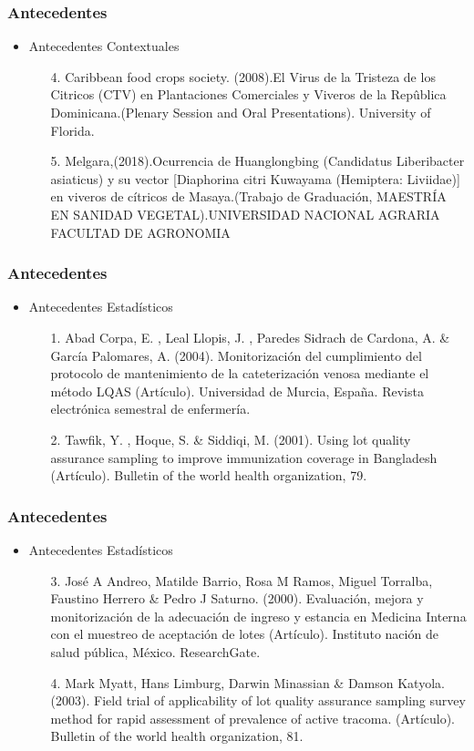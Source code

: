 \documentclass[11pt]{beamer}
\begin{document}
\begin{frame}
\frametitle{Antecedentes}
\begin{itemize}
\item Antecedentes Contextuales
\begin{itemize}
\item[4.]Caribbean food crops society. (2008).El Virus de la Tristeza de los Citricos (CTV) en Plantaciones Comerciales y Viveros
de la Repûblica Dominicana.(Plenary Session and Oral Presentations). University of Florida.
\item[5.]Melgara,(2018).Ocurrencia de Huanglongbing (Candidatus Liberibacter asiaticus) y su vector [Diaphorina citri Kuwayama (Hemiptera: Liviidae)] en viveros de cítricos de Masaya.(Trabajo de Graduación, MAESTRÍA EN SANIDAD VEGETAL).UNIVERSIDAD NACIONAL AGRARIA
FACULTAD DE AGRONOMIA
\end{itemize}
\end{itemize}
\end{frame}

\begin{frame}
\frametitle{Antecedentes}
\begin{itemize}
\item Antecedentes Estadísticos
\begin{itemize}
\item[1.]Abad Corpa, E. , Leal Llopis, J. , Paredes Sidrach de Cardona, A. \& García Palomares, A. (2004). Monitorización del cumplimiento del protocolo de mantenimiento de la cateterización venosa mediante el método LQAS (Artículo). Universidad de Murcia, España. Revista electrónica semestral de enfermería.
\item[2.] Tawfik, Y. , Hoque, S. \&  Siddiqi, M. (2001). Using lot quality assurance sampling to improve immunization coverage in Bangladesh (Artículo). Bulletin of the world health organization, 79.
\end{itemize}
\end{itemize}
\end{frame}

\begin{frame}
\frametitle{Antecedentes}
\begin{itemize}
\item Antecedentes Estadísticos
\begin{itemize}
\item[3.]José A Andreo, Matilde Barrio, Rosa M Ramos, Miguel Torralba, Faustino Herrero \& Pedro J Saturno. (2000). Evaluación, mejora y monitorización de la adecuación de ingreso y estancia en Medicina Interna con el muestreo de aceptación de lotes (Artículo). Instituto nación de salud pública, México. ResearchGate.
\item[4.]Mark Myatt, Hans Limburg, Darwin Minassian \& Damson Katyola. (2003). Field trial of applicability of lot quality assurance sampling survey method for rapid assessment of prevalence of active tracoma. (Artículo). Bulletin of the world health organization, 81.
\end{itemize}
\end{itemize}
\end{frame}
\end{document}
